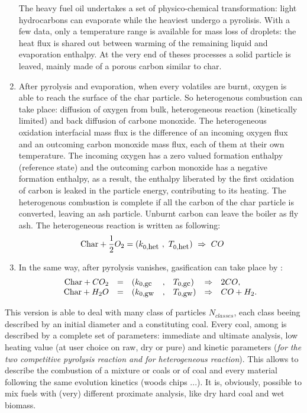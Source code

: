 \begin{enumerate}
The heavy fuel oil undertakes a set of physico-chemical transformation: light
hydrocarbons can evaporate while the heaviest undergo a pyrolisis. With a few
data, only a temperature range is available for mass loss of droplets: the heat
flux is shared out between warming of the remaining liquid and evaporation
enthalpy. At the very end of theses processes a solid particle is leaved, mainly
made of a porous carbon similar to char.
\item After pyrolysis and evaporation, when every volatiles are burnt, oxygen is
  able to reach the surface of the char particle. So heterogenous combustion can
  take place: diffusion of oxygen from bulk, heterogeneous reaction
  (kinetically limited) and back diffusion of carbone monoxide. The
  heterogeneous oxidation interfacial mass flux is the difference of an incoming
  oxygen flux and an outcoming carbon monoxide mass flux, each of them at their
  own temperature. The incoming oxygen has a zero valued formation enthalpy
  (reference state) and the outcoming carbon monoxide has a negative formation
  enthalpy, as a result, the enthalpy liberated by the first oxidation of carbon
  is leaked in the particle energy, contributing to its heating. The
  heterogenous combustion is complete if all the carbon of the char particle is
  converted, leaving an ash particle. Unburnt carbon can leave the boiler as fly
  ash. The heterogeneous reaction is written as following:
\begin{equation*}
\mbox{Char} + \dfrac{1}{2} O_{2} = (k_{0,\mbox{\small het}}~,~ T_{0,\mbox{\small het}}) ~\Rightarrow~ CO \qquad
\end{equation*}

\item In the same way, after pyrolysis vanishes, gasification can take place by :
\begin{equation*}
\begin{array}{r c l c l c l}
\mbox{Char} +  CO_{2} &=&(k_{0,\mbox{\small gc}} &,& T_{0,\mbox{\small gc}}) &\Rightarrow& 2 CO      ,           \\
\mbox{Char} +  H_{2}O &=&(k_{0,\mbox{\small gw}} &,& T_{0,\mbox{\small gw}}) &\Rightarrow& CO + H_{2}.
\end{array}
\end{equation*}
\end{enumerate}

This version is able to deal with many class of particles $N_{classes}$, each
class beeing described by an initial diameter and a constituting coal.  Every
coal, among  is described by a complete set of parameters:
immediate and ultimate analysis, low heating value (at user choice on raw, dry
or pure) and kinetic parameters (\emph{for the two competitive pyrolysis reaction
  and for heterogeneous reaction}). This allows to describe the combustion of a
mixture or coals or of coal and every material following the same evolution
kinetics (woods chips ...). It is, obviously, possible to mix fuels with (very)
different proximate analysis, like dry hard coal and wet biomass.

